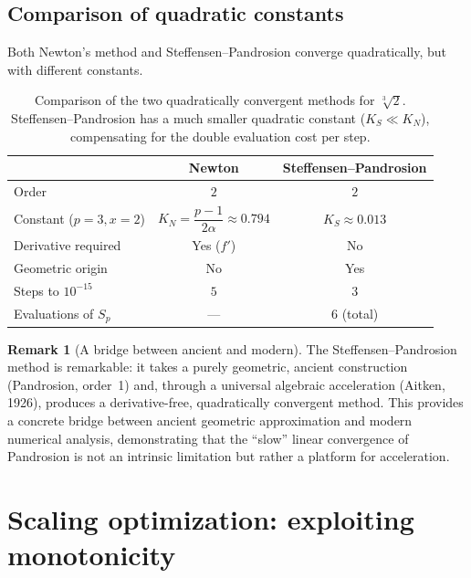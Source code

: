 \documentclass[11pt,a4paper]{article}
\theoremstyle{definition}
\newtheorem{remark}{Remark}[section]
\newcommand{\cbrt}[1]{\sqrt[3]{#1}}
\begin{document}
\subsection{Comparison of quadratic constants}

Both Newton's method and Steffensen--Pandrosion converge quadratically, but with different constants.

\begin{table}[h]
\centering
\renewcommand{\arraystretch}{1.3}
\begin{tabular}{lcc}
\toprule
& \textbf{Newton} & \textbf{Steffensen--Pandrosion} \\
\midrule
Order & $2$ & $2$ \\
Constant ($p\!=\!3, x\!=\!2$) & $K_N = \dfrac{p-1}{2\alpha} \approx 0.794$ & $K_S \approx 0.013$ \\
Derivative required & Yes ($f'$) & No \\
Geometric origin & No & Yes \\
Steps to $10^{-15}$ & $5$ & $3$ \\
Evaluations of $S_p$ & --- & $6$ (total) \\
\bottomrule
\end{tabular}
\caption{Comparison of the two quadratically convergent methods for $\cbrt{2}$. Steffensen--Pandrosion has a much smaller quadratic constant ($K_S \ll K_N$), compensating for the double evaluation cost per step.}
\end{table}

\begin{remark}[A bridge between ancient and modern]
The Steffensen--Pandrosion method is remarkable: it takes a purely geometric, ancient construction (Pandrosion, order~1) and, through a universal algebraic acceleration (Aitken, 1926), produces a derivative-free, quadratically convergent method. This provides a concrete bridge between ancient geometric approximation and modern numerical analysis, demonstrating that the ``slow'' linear convergence of Pandrosion is not an intrinsic limitation but rather a platform for acceleration.
\end{remark}

\section{Scaling optimization: exploiting monotonicity}
\label{sec:scaling}
\end{document}
